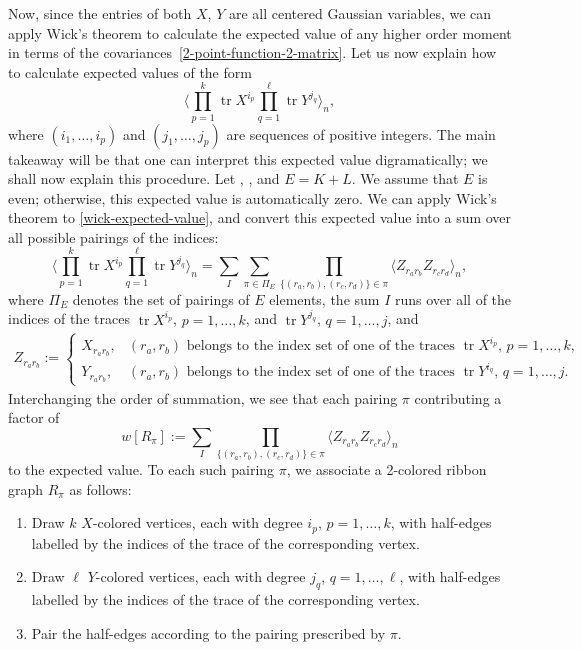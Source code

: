 \documentclass[10pt,a4paper]{amsart}
\DeclareMathOperator{\tr}{tr}
\numberwithin{equation}{section}
\begin{document}
Now, since the entries of both $X$, $Y$ are all centered Gaussian variables, we can apply Wick's theorem to calculate the expected value of any higher order moment in terms of the covariances~\eqref{2-point-function-2-matrix}. Let us now explain how to calculate expected values of the form
 \begin{equation}\label{wick-expected-value}
 \Biggl\langle \prod_{p=1}^k \tr X^{i_p} \prod_{q=1}^\ell \tr Y^{j_q}\Biggr\rangle_n,
 \end{equation}
where $(i_1,\dots,i_p)$ and $(j_1,\dots,j_p)$ are sequences of positive integers. The main takeaway will be that one can interpret this expected value digramatically; we shall now explain this procedure. Let , , and $E = K+L$. We assume that $E$ is even; otherwise, this expected value is automatically zero. We can apply Wick's theorem to \eqref{wick-expected-value}, and convert this expected value into a sum over all possible pairings of the indices:
 \begin{equation*}
 \Biggl\langle \prod_{p=1}^k \tr X^{i_p} \prod_{q=1}^\ell \tr Y^{j_q}\Biggr\rangle_n = \sum_{I} \sum_{\pi \in \Pi_{E}}\prod_{\{(r_a,r_b),(r_c,r_d)\} \in \pi} \langle Z_{r_a r_b} Z_{r_c r_d}\rangle_n,
 \end{equation*}
where $\Pi_{E}$ denotes the set of pairings of $E$ elements, the sum $I$ runs over all of the indices of the traces $\tr X^{i_p}$, $p = 1,\dots,k$, and $\tr Y^{j_q}$, $q = 1,\dots,j$, and
 \begin{gather*}
 Z_{r_a r_b} \!:=\!
 \begin{cases}
 X_{r_a r_b}, & (r_a,r_b) \text{ belongs to the index set of one of the traces $\tr X^{i_p}$, $p\! =\! 1,\dots,k$},\\
 Y_{r_a r_b}, & (r_a,r_b) \text{ belongs to the index set of one of the traces $\tr Y^{i_q}$, $q\! =\! 1,\dots,j$}.
 \end{cases}
 \end{gather*}
Interchanging the order of summation, we see that each pairing $\pi$ contributing a factor of
 \begin{equation*}
 w[R_{\pi}] := \sum_{I}\prod_{\{(r_a,r_b),(r_c,r_d)\} \in \pi} \langle Z_{r_a r_b} Z_{r_c r_d}\rangle_n
 \end{equation*}
to the expected value. To each such pairing $\pi$, we associate a 2-colored ribbon graph $R_\pi$ as follows:
 \begin{enumerate}\itemsep=0pt
 \item[$(1)$] Draw $k$ $X$-colored vertices, each with degree $i_p$, $p=1,\dots,k$, with half-edges labelled by the indices of the trace of the corresponding vertex.
 \item[$(2)$] Draw $\ell$ $Y$-colored vertices, each with degree $j_q$, $q=1,\dots,\ell$, with half-edges labelled by the indices of the trace of the corresponding vertex.
 \item[$(3)$] Pair the half-edges according to the pairing prescribed by $\pi$.
 \end{enumerate}
\end{document}
